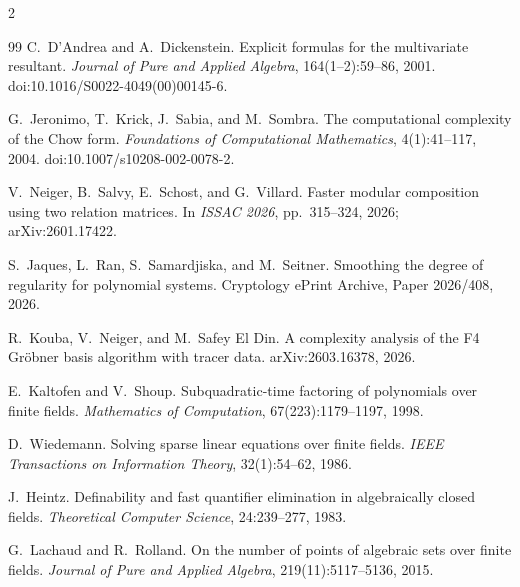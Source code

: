 \documentclass[11pt,a4paper]{article}
\theoremstyle{definition}
\theoremstyle{remark}
\begin{document}
\begin{multicols}{2}
\begin{thebibliography}{99}
C.~D'Andrea and A.~Dickenstein.
\newblock Explicit formulas for the multivariate resultant.
\newblock \emph{Journal of Pure and Applied Algebra}, 164(1--2):59--86, 2001.
\newblock doi:10.1016/S0022-4049(00)00145-6.

G.~Jeronimo, T.~Krick, J.~Sabia, and M.~Sombra.
\newblock The computational complexity of the Chow form.
\newblock \emph{Foundations of Computational Mathematics}, 4(1):41--117, 2004.
\newblock doi:10.1007/s10208-002-0078-2.

V.~Neiger, B.~Salvy, E.~Schost, and G.~Villard.
\newblock Faster modular composition using two relation matrices.
\newblock In \emph{ISSAC 2026}, pp.~315--324, 2026; arXiv:2601.17422.

S.~Jaques, L.~Ran, S.~Samardjiska, and M.~Seitner.
\newblock Smoothing the degree of regularity for polynomial systems.
\newblock Cryptology ePrint Archive, Paper 2026/408, 2026.

R.~Kouba, V.~Neiger, and M.~Safey El Din.
\newblock A complexity analysis of the F4 Gr\"obner basis algorithm with tracer data.
\newblock arXiv:2603.16378, 2026.

E.~Kaltofen and V.~Shoup.
\newblock Subquadratic-time factoring of polynomials over finite fields.
\newblock \emph{Mathematics of Computation}, 67(223):1179--1197, 1998.

D.~Wiedemann.
\newblock Solving sparse linear equations over finite fields.
\newblock \emph{IEEE Transactions on Information Theory}, 32(1):54--62, 1986.

J.~Heintz.
\newblock Definability and fast quantifier elimination in algebraically closed fields.
\newblock \emph{Theoretical Computer Science}, 24:239--277, 1983.

G.~Lachaud and R.~Rolland.
\newblock On the number of points of algebraic sets over finite fields.
\newblock \emph{Journal of Pure and Applied Algebra}, 219(11):5117--5136, 2015.

\end{thebibliography}
\end{multicols}
\end{document}
